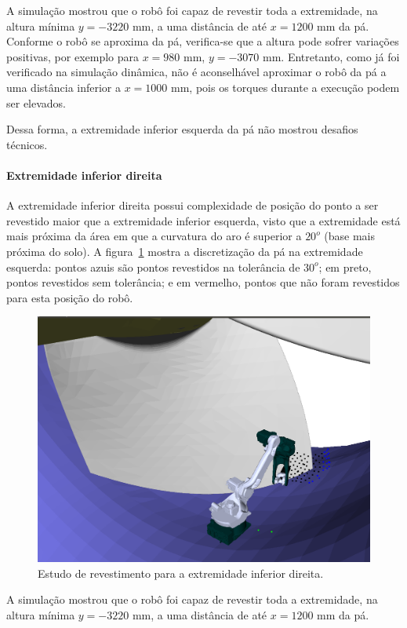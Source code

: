 A simulação mostrou que o robô foi capaz de revestir toda a extremidade, na
altura mínima $y=-3220$ mm, a uma distância de até $x=1200$ mm da pá. Conforme o
robô se aproxima da pá, verifica-se que a altura pode sofrer variações
positivas, por exemplo para $x=980$ mm, $y=-3070$ mm. Entretanto, como já foi
verificado na simulação dinâmica, não é aconselhável aproximar o robô da pá a
uma distância inferior a $x=1000$ mm, pois os torques durante a execução podem ser
elevados.

Dessa forma, a extremidade inferior esquerda da pá não mostrou desafios
técnicos.

\paragraph{Extremidade inferior direita}

A extremidade inferior direita possui complexidade de posição do ponto a
ser revestido maior que a extremidade inferior esquerda, visto que a extremidade
está mais próxima da área em que a curvatura do aro é superior a $20^o$ (base
mais próxima do solo). A figura~\ref{fig::footright} mostra a discretização da
pá na extremidade esquerda: pontos azuis são pontos revestidos na tolerância de
$30^o$; em preto, pontos revestidos sem tolerância; e em vermelho, pontos que
não foram revestidos para esta posição do robô.

\begin{figure}[!ht]
	\centering	
	\includegraphics[width=0.7\columnwidth]{method/figs/footright.png}
	\caption{Estudo de revestimento para a extremidade inferior direita.}
	\label{fig::footright}
\end{figure}

A simulação mostrou que o robô foi capaz de revestir toda a extremidade, na
altura mínima $y=-3220$ mm, a uma distância de até $x=1200$ mm da pá. 

